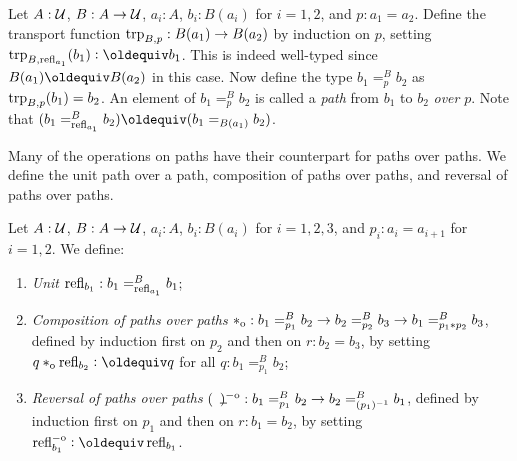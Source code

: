 \documentclass[a4paper,12pt]{amsart}
\begin{document}
\begin{definition}\label{def:pathover}
Let $A : \mathcal{U}$, $B : A \to \mathcal{U}$, $a_i:A$, $b_i:B(a_i)$ for $i=1,2$, and $p : a_1 = a_2$.
Define the transport function $\mathop{\mathrm{trp}_{B,p}} : B(a_1)\to B(a_2)$ by induction on $p$,
setting $\trp{B,\refl{a_1}}(b_1)\defeq b_1$. This is indeed well-typed since
$B(a_1)\jdeq B(a_2)$ in this case.
Now define the type $b_1 =^B_p b_2$ as $\mathop{\mathrm{trp}_{B,p}}(b_1) = b_2$.
An element of $b_1 =^B_p b_2$ is called
a \emph{path} from $b_1$ to $b_2$ \emph{over} $p$.
Note that $(b_1 =^B_{\refl{a_1}} b_2) \jdeq (b_1 =_{B(a_1)}  b_2)$.
\end{definition}

Many of the operations on paths have their counterpart for paths over paths.
We define the unit path over a path, composition of paths over paths, and reversal of paths over paths.

\begin{definition}\label{def:pathoveralgebra}
  Let $A : \mathcal{U}$, $B : A \to \mathcal{U}$, $a_i:A$, $b_i:B(a_i)$ for $i=1,2,3$, and
  $p_i : a_i = a_{i+1}$ for $i=1,2$. We define:
  \begin{enumerate}[topsep=3pt]
  \item \emph{Unit} $\mathop{{\mathrm{refl}}_{b_1}} : b_1 =^B_{\mathop{{\mathrm{refl}}_{a_1}}} b_1$;
  \item \emph{Composition of paths over paths}
    $\mathbin{*_{\mathrm{o}}} : b_1 =^B_{p_1} b_2 \to b_2 =^B_{p_2} b_3 \to b_1 =^B_{p_1 * p_2} b_3$,
    defined by induction first on $p_2$ and then on $r: b_2 = b_3$, by
    setting $q \cto \reflo{b_2} \defeq q$ for all $q: b_1 =^B_{p_1} b_2$;
  \item \emph{Reversal of paths over paths}
    $(\blank)\invo : b_1 =^B_{p_1} b_2 \to b_2 =^B_{(p_1)^{-1}} b_1$,
    defined by induction first on $p_1$ and then on $r: b_1 = b_2$, by
    setting $\refloi{b_1} \defeq \refl{b_1}$.
  \end{enumerate}
\end{definition}
\end{document}

